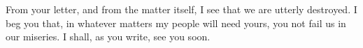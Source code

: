 

From your letter, and from the matter itself, I see that we are utterly destroyed. I beg you that, in whatever matters my people will need yours, you not fail us in our miseries. I shall, as you write, see you soon.
